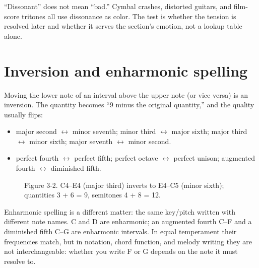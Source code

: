 ``Dissonant'' does not mean ``bad.'' Cymbal crashes, distorted guitars, and film-score tritones all use dissonance as color. The test is whether the tension is resolved later and whether it serves the section's emotion, not a lookup table alone.

\section{Inversion and enharmonic spelling}

Moving the lower note of an interval above the upper note (or vice versa) is an inversion. The quantity becomes ``9 minus the original quantity,'' and the quality usually flips:

\begin{itemize}
  \item major second $\leftrightarrow$ minor seventh; minor third $\leftrightarrow$ major sixth; major third $\leftrightarrow$ minor sixth; major seventh $\leftrightarrow$ minor second.
  \item perfect fourth $\leftrightarrow$ perfect fifth; perfect octave $\leftrightarrow$ perfect unison; augmented fourth $\leftrightarrow$ diminished fifth.
\end{itemize}

\begin{figure}[htbp]
\centering
{}

\small Figure 3-2. C4--E4 (major third) inverts to E4--C5 (minor sixth); quantities 3 + 6 = 9, semitones 4 + 8 = 12.
\end{figure}

Enharmonic spelling is a different matter: the same key/pitch written with different note names. C\sharpsym{} and D\flatsym{} are enharmonic; an augmented fourth C--F\sharpsym{} and a diminished fifth C--G\flatsym{} are enharmonic intervals. In equal temperament their frequencies match, but in notation, chord function, and melody writing they are not interchangeable: whether you write F\sharpsym{} or G\flatsym{} depends on the note it must resolve to.

